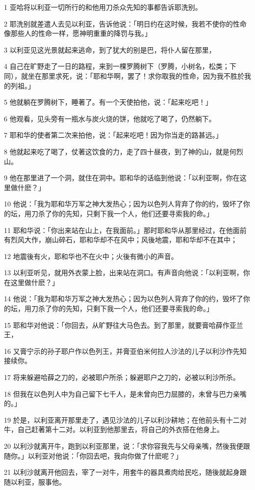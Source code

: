 \par 1 亚哈将以利亚一切所行的和他用刀杀众先知的事都告诉耶洗别。
\par 2 耶洗别就差遣人去见以利亚，告诉他说：「明日约在这时候，我若不使你的性命像那些人的性命一样，愿神明重重的降罚与我。」
\par 3 以利亚见这光景就起来逃命，到了犹大的别是巴，将仆人留在那里，
\par 4 自己在旷野走了一日的路程，来到一棵罗腾树下（罗腾，小树名，松类；下同），就坐在那里求死，说：「耶和华啊，罢了！求你取我的性命，因为我不胜於我的列祖。」
\par 5 他就躺在罗腾树下，睡著了。有一个天使拍他，说：「起来吃吧！」
\par 6 他观看，见头旁有一瓶水与炭火烧的饼，他就吃了喝了，仍然躺下。
\par 7 耶和华的使者第二次来拍他，说：「起来吃吧！因为你当走的路甚远。」
\par 8 他就起来吃了喝了，仗著这饮食的力，走了四十昼夜，到了神的山，就是何烈山。
\par 9 他在那里进了一个洞，就住在洞中。耶和华的话临到他说：「以利亚啊，你在这里做什麽？」
\par 10 他说：「我为耶和华万军之神大发热心；因为以色列人背弃了你的约，毁坏了你的坛，用刀杀了你的先知，只剩下我一个人，他们还要寻索我的命。」
\par 11 耶和华说：「你出来站在山上，在我面前。」那时耶和华从那里经过，在他面前有烈风大作，崩山碎石，耶和华却不在风中；风後地震，耶和华却不在其中；
\par 12 地震後有火，耶和华也不在火中；火後有微小的声音。
\par 13 以利亚听见，就用外衣蒙上脸，出来站在洞口。有声音向他说：「以利亚啊，你在这里做什麽？」
\par 14 他说：「我为耶和华万军之神大发热心；因为以色列人背弃了你的约，毁坏了你的坛，用刀杀了你的先知，只剩下我一个人，他们还要寻索我的命。」
\par 15 耶和华对他说：「你回去，从旷野往大马色去。到了那里，就要膏哈薛作亚兰王，
\par 16 又膏宁示的孙子耶户作以色列王，并膏亚伯米何拉人沙法的儿子以利沙作先知接续你。
\par 17 将来躲避哈薛之刀的，必被耶户所杀；躲避耶户之刀的，必被以利沙所杀。
\par 18 但我在以色列人中为自己留下七千人，是未曾向巴力屈膝的，未曾与巴力亲嘴的。」
\par 19 於是，以利亚离开那里走了，遇见沙法的儿子以利沙耕地；在他前头有十二对牛，自己赶著第十二对。以利亚到他那里去，将自己的外衣搭在他身上。
\par 20 以利沙就离开牛，跑到以利亚那里，说：「求你容我先与父母亲嘴，然後我便跟随你。」以利亚对他说：「你回去吧，我向你做了什麽呢？」
\par 21 以利沙就离开他回去，宰了一对牛，用套牛的器具煮肉给民吃，随後就起身跟随以利亚，服事他。

